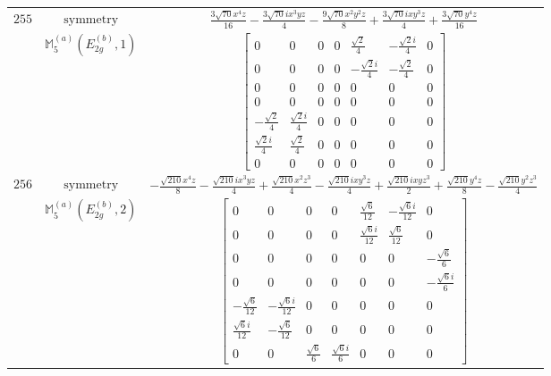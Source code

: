 \documentclass[fleqn,8pt,landscape]{jsarticle}
\begin{document}
\begin{longtable}{ccc}
$ 255 $ & $ \text{symmetry} $ & $ \frac{3 \sqrt{70} x^{4} z}{16} - \frac{3 \sqrt{70} i x^{3} y z}{4} - \frac{9 \sqrt{70} x^{2} y^{2} z}{8} + \frac{3 \sqrt{70} i x y^{3} z}{4} + \frac{3 \sqrt{70} y^{4} z}{16} $ \\
$  $ & $ \mathbb{M}_{5}^{(a)}(E_{2g}^{(b)},1) $ & $ \begin{bmatrix} 0 & 0 & 0 & 0 & \frac{\sqrt{2}}{4} & - \frac{\sqrt{2} i}{4} & 0 \\ 0 & 0 & 0 & 0 & - \frac{\sqrt{2} i}{4} & - \frac{\sqrt{2}}{4} & 0 \\ 0 & 0 & 0 & 0 & 0 & 0 & 0 \\ 0 & 0 & 0 & 0 & 0 & 0 & 0 \\ - \frac{\sqrt{2}}{4} & \frac{\sqrt{2} i}{4} & 0 & 0 & 0 & 0 & 0 \\ \frac{\sqrt{2} i}{4} & \frac{\sqrt{2}}{4} & 0 & 0 & 0 & 0 & 0 \\ 0 & 0 & 0 & 0 & 0 & 0 & 0 \end{bmatrix} $ \\ \hline
$ 256 $ & $ \text{symmetry} $ & $ - \frac{\sqrt{210} x^{4} z}{8} - \frac{\sqrt{210} i x^{3} y z}{4} + \frac{\sqrt{210} x^{2} z^{3}}{4} - \frac{\sqrt{210} i x y^{3} z}{4} + \frac{\sqrt{210} i x y z^{3}}{2} + \frac{\sqrt{210} y^{4} z}{8} - \frac{\sqrt{210} y^{2} z^{3}}{4} $ \\
$  $ & $ \mathbb{M}_{5}^{(a)}(E_{2g}^{(b)},2) $ & $ \begin{bmatrix} 0 & 0 & 0 & 0 & \frac{\sqrt{6}}{12} & - \frac{\sqrt{6} i}{12} & 0 \\ 0 & 0 & 0 & 0 & \frac{\sqrt{6} i}{12} & \frac{\sqrt{6}}{12} & 0 \\ 0 & 0 & 0 & 0 & 0 & 0 & - \frac{\sqrt{6}}{6} \\ 0 & 0 & 0 & 0 & 0 & 0 & - \frac{\sqrt{6} i}{6} \\ - \frac{\sqrt{6}}{12} & - \frac{\sqrt{6} i}{12} & 0 & 0 & 0 & 0 & 0 \\ \frac{\sqrt{6} i}{12} & - \frac{\sqrt{6}}{12} & 0 & 0 & 0 & 0 & 0 \\ 0 & 0 & \frac{\sqrt{6}}{6} & \frac{\sqrt{6} i}{6} & 0 & 0 & 0 \end{bmatrix} $ \\ \hline
\end{longtable}
\end{document}
